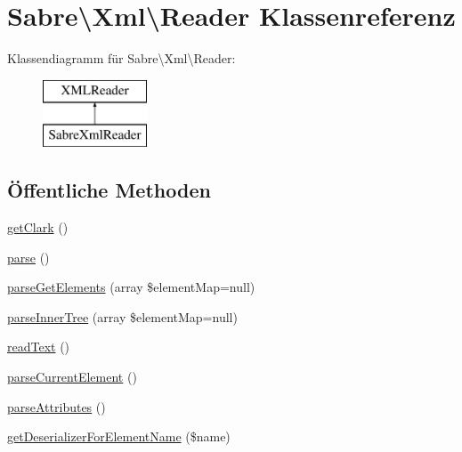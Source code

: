 \hypertarget{class_sabre_1_1_xml_1_1_reader}{}\section{Sabre\textbackslash{}Xml\textbackslash{}Reader Klassenreferenz}
\label{class_sabre_1_1_xml_1_1_reader}
Klassendiagramm für Sabre\textbackslash{}Xml\textbackslash{}Reader\+:\begin{figure}[H]
\begin{center}
\leavevmode
\includegraphics[height=2.000000cm]{class_sabre_1_1_xml_1_1_reader}
\end{center}
\end{figure}
\subsection*{Öffentliche Methoden}
\begin{DoxyCompactItemize}
\item 
\mbox{\hyperlink{class_sabre_1_1_xml_1_1_reader_ac55a1656052682d30a6f43aeb48220ca}{get\+Clark}} ()
\item 
\mbox{\hyperlink{class_sabre_1_1_xml_1_1_reader_af918d81cafeab81a7e1eab0c32c25da7}{parse}} ()
\item 
\mbox{\hyperlink{class_sabre_1_1_xml_1_1_reader_a1a77fcd5dbe2db9ed238f9e7afd4c6e2}{parse\+Get\+Elements}} (array \$element\+Map=null)
\item 
\mbox{\hyperlink{class_sabre_1_1_xml_1_1_reader_a6621ccff3f12f0fd262de08e948fd2bb}{parse\+Inner\+Tree}} (array \$element\+Map=null)
\item 
\mbox{\hyperlink{class_sabre_1_1_xml_1_1_reader_ae0c223537bae036b13bc4da2e2881179}{read\+Text}} ()
\item 
\mbox{\hyperlink{class_sabre_1_1_xml_1_1_reader_a0e72167035aa4fe05e7ed54b4f9f44bd}{parse\+Current\+Element}} ()
\item 
\mbox{\hyperlink{class_sabre_1_1_xml_1_1_reader_a174dc5b37a08e3842ccfa96ed7d7bfff}{parse\+Attributes}} ()
\item 
\mbox{\hyperlink{class_sabre_1_1_xml_1_1_reader_ae2db9561397736daa69f003dc364356f}{get\+Deserializer\+For\+Element\+Name}} (\$name)
\end{DoxyCompactItemize}


